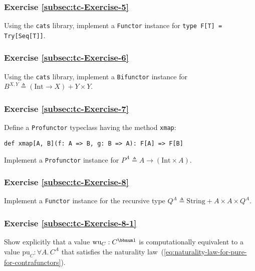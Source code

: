 \subsubsection{Exercise \label{subsec:tc-Exercise-5}\ref{subsec:tc-Exercise-5}}

Using the \texttt{cats} library, implement a \lstinline!Functor!
instance for \lstinline!type F[T] = Try[Seq[T]]!.

\subsubsection{Exercise \label{subsec:tc-Exercise-6}\ref{subsec:tc-Exercise-6}}

Using the \texttt{cats} library, implement a \lstinline!Bifunctor!
instance for $B^{X,Y}\triangleq\left(\text{Int}\rightarrow X\right)+Y\times Y$.

\subsubsection{Exercise \label{subsec:tc-Exercise-7}\ref{subsec:tc-Exercise-7}}

Define a \lstinline!Profunctor! typeclass having the method \lstinline!xmap!:

\begin{lstlisting}
def xmap[A, B](f: A => B, g: B => A): F[A] => F[B]
\end{lstlisting}
Implement a \lstinline!Profunctor! instance for $P^{A}\triangleq A\rightarrow\left(\text{Int}\times A\right)$.

\subsubsection{Exercise \label{subsec:tc-Exercise-8}\ref{subsec:tc-Exercise-8}}

Implement a \lstinline!Functor! instance for the recursive type $Q^{A}\triangleq\text{String}+A\times A\times Q^{A}$.

\subsubsection{Exercise \label{subsec:tc-Exercise-8-1}\ref{subsec:tc-Exercise-8-1}}

Show explicitly that a value $\text{wu}_{C}:C^{\bbnum 1}$ is computationally
equivalent to a value $\text{pu}_{C}:\forall A.\,C^{A}$ that satisfies
the naturality law~(\ref{eq:naturality-law-for-pure-for-contrafunctors}).

